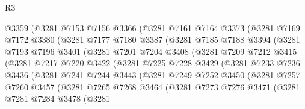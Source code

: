 \begin{lexlean}{R3}
\begin{coremodule}
              @3359
              (@3281
                @7153
                @7156
                @3366
                (@3281
                  @7161
                  @7164
                  @3373
                  (@3281
                    @7169
                    @7172
                    @3380
                    (@3281
                      @7177
                      @7180
                      @3387
                      (@3281
                        @7185
                        @7188
                        @3394
                        (@3281
                          @7193
                          @7196
                          @3401
                          (@3281
                            @7201
                            @7204
                            @3408
                            (@3281
                              @7209
                              @7212
                              @3415
                              (@3281
                                @7217
                                @7220
                                @3422
                                (@3281
                                  @7225
                                  @7228
                                  @3429
                                  (@3281
                                    @7233
                                    @7236
                                    @3436
                                    (@3281
                                      @7241
                                      @7244
                                      @3443
                                      (@3281
                                        @7249
                                        @7252
                                        @3450
                                        (@3281
                                          @7257
                                          @7260
                                          @3457
                                          (@3281
                                            @7265
                                            @7268
                                            @3464
                                            (@3281
                                              @7273
                                              @7276
                                              @3471
                                              (@3281
                                                @7281
                                                @7284
                                                @3478
                                                (@3281

\end{coremodule}
\end{lexlean}
